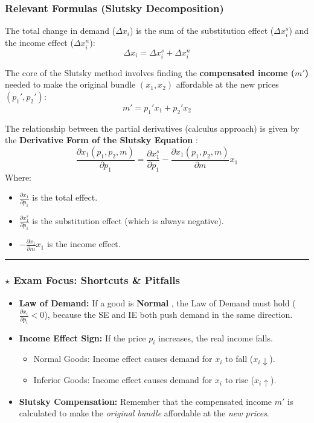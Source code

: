 \documentclass{article}
\begin{document}
\subsubsection*{Relevant Formulas (Slutsky Decomposition)}

The total change in demand ($\Delta x_i$) is the sum of the substitution effect ($\Delta x_i^s$) and the income effect ($\Delta x_i^n$): \[\Delta x_i = \Delta x_i^s + \Delta x_i^n\]

The core of the Slutsky method involves finding the \textbf{compensated income ($m'$)} needed to make the original bundle $(x_1, x_2)$ affordable at the new prices $(p_1', p_2')$: \[m' = p_1' x_1 + p_2' x_2\]

The relationship between the partial derivatives (calculus approach) is given by the \textbf{Derivative Form of the Slutsky Equation} : \[\frac{\partial x_1(p_1, p_2, m)}{\partial p_1} = \frac{\partial x_1^s}{\partial p_1} - \frac{\partial x_1(p_1, p_2, m)}{\partial m} x_1\] Where:

\begin{itemize}
    \item $\frac{\partial x_1}{\partial p_1}$ is the total effect.
    \item $\frac{\partial x_1^s}{\partial p_1}$ is the substitution effect (which is always negative).
    \item $-\frac{\partial x_1}{\partial m} x_1$ is the income effect.
\end{itemize}

\vspace{5pt}\noindent\rule{\linewidth}{0.4pt}\vspace{5pt}

\subsubsection*{$\star$ Exam Focus: Shortcuts \& Pitfalls}

\begin{itemize}
    \item \textbf{Law of Demand:} If a good is \textbf{Normal} , the Law of Demand must hold ($\frac{\partial x_i}{\partial p_i} < 0$), because the SE and IE both push demand in the same direction.
    \item \textbf{Income Effect Sign:} If the price $p_i$ increases, the real income falls.
    \begin{itemize}
        \item Normal Goods: Income effect causes demand for $x_i$ to fall ($x_i \downarrow$).
        \item Inferior Goods: Income effect causes demand for $x_i$ to rise ($x_i \uparrow$).
    \end{itemize}
    \item \textbf{Slutsky Compensation:} Remember that the compensated income $m'$ is calculated to make the \textit{original bundle} affordable at the \textit{new prices}.
\end{itemize}
\end{document}
